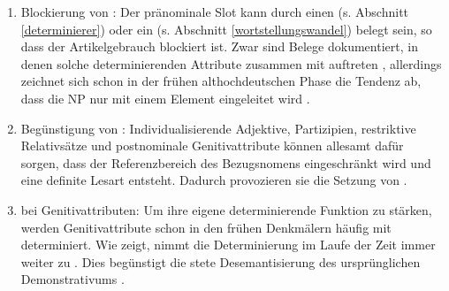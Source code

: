 \begin{enumerate}
\item Blockierung von : Der pränominale Slot kann durch einen  (s. Abschnitt \ref{determinierer}) oder ein  (s. Abschnitt \ref{wortstellungswandel}) belegt sein, so dass der Artikelgebrauch blockiert ist. Zwar sind Belege dokumentiert, in denen solche determinierenden Attribute zusammen  mit  auftreten \parencite[vgl. z.B. die Belegsammlungen in][60--78]{Graf1905},  allerdings zeichnet sich schon in der frühen althochdeutschen Phase die Tendenz ab, dass die NP  nur mit einem Element eingeleitet wird \parencite{Oubouzar1997}.
\item Begünstigung von : Individualisierende  Adjektive, Partizipien, restriktive Relativsätze und postnominale Genitivattribute  können allesamt dafür sorgen, dass der Referenzbereich  des Bezugsnomens eingeschränkt wird und eine definite Lesart entsteht. Dadurch provozieren sie die Setzung von  \parencite[24--25]{Schrodt2004}.
\item {} bei Genitivattributen: Um ihre eigene determinierende Funktion zu stärken, werden Genitivattribute  schon in den frühen Denkmälern häufig mit  determiniert. Wie \textcite{Oubouzar1989, Oubouzar1992, Oubouzar1997} zeigt, nimmt die Determinierung im Laufe der Zeit immer weiter zu \parencite[185]{Leiss2000}. Dies begünstigt die stete Desemantisierung des ursprünglichen Demonstrativums \parencite{Szczepaniak2015}.
\end{enumerate}


